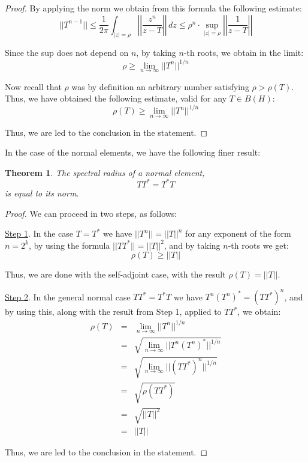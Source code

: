 \documentclass[12pt]{amsbook}
\newtheorem{theorem}{Theorem}[chapter]
\begin{document}
\begin{proof}
By applying the norm we obtain from this formula the following estimate:
$$||T^{n-1}||
\leq\frac{1}{2\pi}\int_{|z|=\rho}\left|\left|\frac{z^n}{z-T}\right|\right|\,dz
\leq\rho^n\cdot\sup_{|z|=\rho}\left|\left|\frac{1}{z-T}\right|\right|$$

Since the sup does not depend on $n$, by taking $n$-th roots, we obtain in the limit:
$$\rho\geq\lim_{n\to\infty}||T^n||^{1/n}$$

Now recall that $\rho$ was by definition an arbitrary number satisfying $\rho>\rho(T)$. Thus, we have obtained the following estimate, valid for any $T\in B(H)$:
$$\rho(T)\geq\lim_{n\to\infty}||T^n||^{1/n}$$

Thus, we are led to the conclusion in the statement.
\end{proof}

In the case of the normal elements, we have the following finer result:


\begin{theorem}
The spectral radius of a normal element,
$$TT^*=T^*T$$
is equal to its norm.
\end{theorem}

\begin{proof}
We can proceed in two steps, as follows:

\medskip

\underline{Step 1}. In the case $T=T^*$ we have $||T^n||=||T||^n$ for any exponent of the form $n=2^k$, by using the formula $||TT^*||=||T||^2$, and by taking $n$-th roots we get:
$$\rho(T)\geq||T||$$

Thus, we are done with the self-adjoint case, with the result $\rho(T)=||T||$.

\medskip

\underline{Step 2}. In the general normal case $TT^*=T^*T$ we have $T^n(T^n)^*=(TT^*)^n$, and by using this, along with the result from Step 1, applied to $TT^*$, we obtain:
\begin{eqnarray*}
\rho(T)
&=&\lim_{n\to\infty}||T^n||^{1/n}\\
&=&\sqrt{\lim_{n\to\infty}||T^n(T^n)^*||^{1/n}}\\
&=&\sqrt{\lim_{n\to\infty}||(TT^*)^n||^{1/n}}\\
&=&\sqrt{\rho(TT^*)}\\
&=&\sqrt{||T||^2}\\
&=&||T||
\end{eqnarray*}

Thus, we are led to the conclusion in the statement.
\end{proof}
\end{document}
